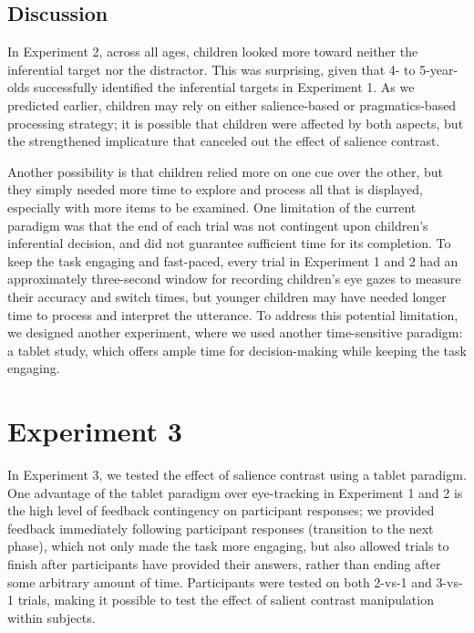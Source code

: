 \documentclass[a4paper,man,apacite,floatsintext]{apa6}
\begin{document}
\subsection{Discussion}\label{discussion-1}

In Experiment 2, across all ages, children looked more toward neither
the inferential target nor the distractor. This was surprising, given
that 4- to 5-year-olds successfully identified the inferential targets
in Experiment 1. As we predicted earlier, children may rely on either
salience-based or pragmatics-based processing strategy; it is possible
that children were affected by both aspects, but the strengthened
implicature that canceled out the effect of salience contrast.

Another possibility is that children relied more on one cue over the
other, but they simply needed more time to explore and process all that
is displayed, especially with more items to be examined. One limitation
of the current paradigm was that the end of each trial was not
contingent upon children's inferential decision, and did not guarantee
sufficient time for its completion. To keep the task engaging and
fast-paced, every trial in Experiment 1 and 2 had an approximately
three-second window for recording children's eye gazes to measure their
accuracy and switch times, but younger children may have needed longer
time to process and interpret the utterance. To address this potential
limitation, we designed another experiment, where we used another
time-sensitive paradigm: a tablet study, which offers ample time for
decision-making while keeping the task engaging.

\section{Experiment 3}\label{experiment-3}

In Experiment 3, we tested the effect of salience contrast using a
tablet paradigm. One advantage of the tablet paradigm over eye-tracking
in Experiment 1 and 2 is the high level of feedback contingency on
participant responses; we provided feedback immediately following
participant responses (transition to the next phase), which not only
made the task more engaging, but also allowed trials to finish after
participants have provided their answers, rather than ending after some
arbitrary amount of time. Participants were tested on both 2-vs-1 and
3-vs-1 trials, making it possible to test the effect of salient contrast
manipulation within subjects.
\end{document}
